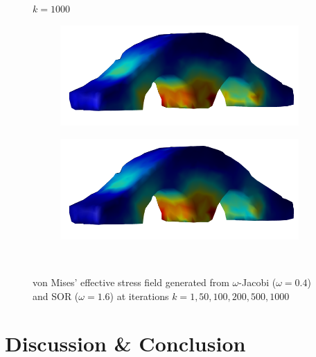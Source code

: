 \documentclass[11pt,titlepage]{article}
\begin{document}
\begin{figure}[!htbp]
\begin{center}
        $k=1000$
        \quad
        \begin{subfigure}[b]{0.4\textwidth}
            \centering
            \includegraphics[width=\textwidth]{jacopt_vm/resized/archbridge_tiny_1000}
        \end{subfigure}
        \begin{subfigure}[b]{0.4\textwidth}
            \centering
            \includegraphics[width=\textwidth]{soropt_vm/resized/archbridge_tiny_1000}
        \end{subfigure}\\ 
        \caption{\label{fig:5} von Mises' effective stress field generated from $\omega$-Jacobi ($\omega=0.4$) and SOR ($\omega=1.6$) at iterations $k=1,50,100,200,500,1000$}
    \end{center}
\end{figure}

\section{Discussion \& Conclusion}
\end{document}
